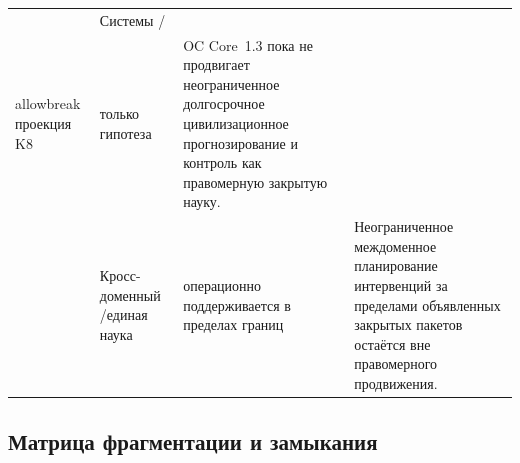 \begin{longtable}{@{}L{0.15\textwidth}L{0.12\textwidth}L{0.13\textwidth}L{0.50\textwidth}@{}}
 & Системы /\\allowbreak проекция K8 & только гипотеза & OC Core~1.3 пока не продвигает неограниченное долгосрочное цивилизационное прогнозирование и контроль как правомерную закрытую науку. \\
 & Кросс-доменный /\allowbreak единая наука & операционно поддерживается в пределах границ & Неограниченное междоменное планирование интервенций за пределами объявленных закрытых пакетов остаётся вне правомерного продвижения. \\
\bottomrule
\end{longtable}

\subsection{Матрица фрагментации и замыкания}

